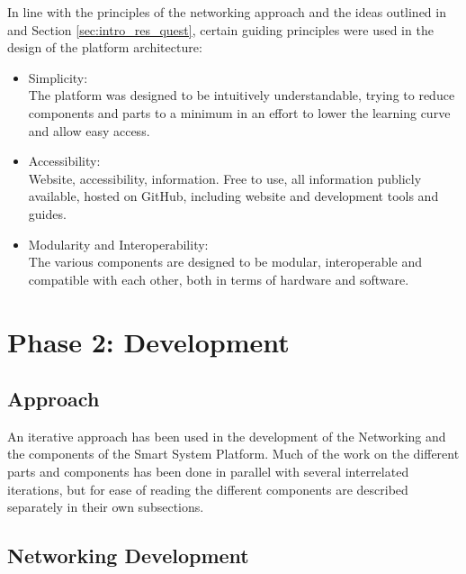 
In line with the principles of the networking approach and the ideas outlined in \citet[]{dahal_designing_2024} and Section \ref{sec:intro_res_quest}, certain guiding principles were used in the design of the platform architecture: 

\begin{itemize}
    \item Simplicity:\\
    The platform was designed to be intuitively understandable, trying to reduce components and parts to a minimum in an effort to lower the learning curve and allow easy access.
    \item Accessibility:\\
    Website, accessibility, information. Free to use, all information publicly available, hosted on GitHub, including website and development tools and guides.
    \item Modularity and Interoperability:\\
    The various components are designed to be modular, interoperable and compatible with each other, both in terms of hardware and software. 
\end{itemize}

\section{\label{sec:methods_ph2}Phase 2: Development}

\subsection{\label{sec:methods_approach}Approach}

An iterative approach has been used in the development of the Networking and the components of the Smart System Platform. Much of the work on the different parts and components has been done in parallel with several interrelated iterations, but for ease of reading the different components are described separately in their own subsections.

\subsection{\label{sec:methods_net_dev}Networking Development}

